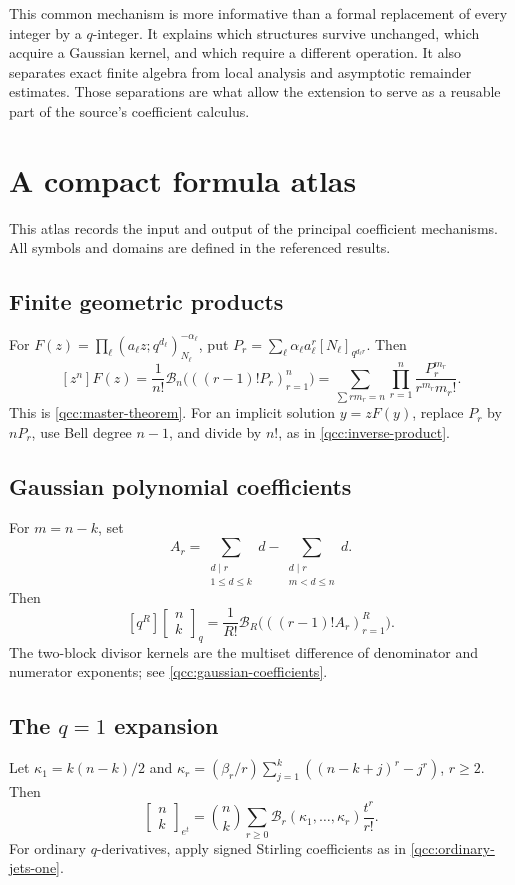 \documentclass[11pt,a4paper,oneside,openany]{book}
\theoremstyle{definition}
\theoremstyle{remark}
\newcommand{\GB}[3][q]{\begin{bmatrix}#2\\#3\end{bmatrix}_{#1}}
\newcommand{\Y}[1]{\mathcal B_{#1}}
\begin{document}
This common mechanism is more informative than a formal replacement of every
integer by a \(q\)-integer. It explains which structures survive unchanged,
which acquire a Gaussian kernel, and which require a different operation.
It also separates exact finite algebra from local analysis and asymptotic
remainder estimates. Those separations are what allow the extension to serve
as a reusable part of the source's coefficient calculus.

\appendix
\chapter{A compact formula atlas}
\label{qcc:atlas}
This atlas records the input and output of the principal coefficient mechanisms.
All symbols and domains are defined in the referenced results.

\section*{Finite geometric products}
For
\(F(z)=\prod_\ell(a_\ell z;q^{d_\ell})_{N_\ell}^{-\alpha_\ell}\), put
\(P_r=\sum_\ell\alpha_\ell a_\ell^r[N_\ell]_{q^{d_\ell r}}\). Then
\[
 [z^n]F(z)=\frac1{n!}\Y n\bigl(((r-1)!P_r)_{r=1}^{n}\bigr)
 =\sum_{\sum rm_r=n}\prod_{r=1}^{n}\frac{P_r^{m_r}}{r^{m_r}m_r!}.
\]
This is \cref{qcc:master-theorem}. For an implicit solution \(y=zF(y)\),
replace \(P_r\) by \(nP_r\), use Bell degree \(n-1\), and divide by
\(n!\), as in \cref{qcc:inverse-product}.

\section*{Gaussian polynomial coefficients}
For \(m=n-k\), set
\[
 A_r=\sum_{\substack{d\mid r\\1\le d\le k}}d
     -\sum_{\substack{d\mid r\\m<d\le n}}d.
\]
Then
\[
 [q^R]\GB nk=\frac1{R!}
       \Y R\bigl(((r-1)!A_r)_{r=1}^{R}\bigr).
\]
The two-block divisor kernels are the multiset difference of denominator and
numerator exponents; see \cref{qcc:gaussian-coefficients}.

\section*{The \(q=1\) expansion}
Let
\(\kappa_1=k(n-k)/2\) and
\(\kappa_r=(\beta_r/r)\sum_{j=1}^{k}((n-k+j)^r-j^r)\), \(r\ge2\).
Then
\[
 \GB[e^t]nk=\binom nk\sum_{r\ge0}\Y r(\kappa_1,\ldots,\kappa_r)
                                      \frac{t^r}{r!}.
\]
For ordinary \(q\)-derivatives, apply signed Stirling coefficients as in
\eqref{qcc:ordinary-jets-one}.
\end{document}
